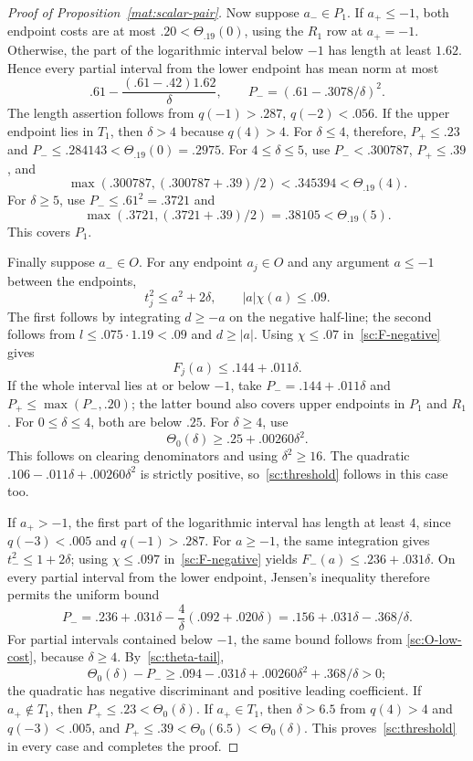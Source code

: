 \begin{proof}[Proof of Proposition~\ref{mat:scalar-pair}]
Now suppose $a_-\in P_1$.  If $a_+\le-1$, both endpoint costs are at
most $.20<\Theta_{.19}(0)$, using the $R_1$ row at $a_+=-1$.
Otherwise, the part of the logarithmic
interval below $-1$ has length at least $1.62$.  Hence every partial
interval from the lower endpoint has mean norm at most
\[
 .61-\frac{(.61-.42)1.62}{\delta},\qquad
 P_-=(.61-.3078/\delta)^2.
\]
The length assertion follows from $q(-1)>.287$, $q(-2)<.056$.
If the upper endpoint lies in $T_1$, then $\delta>4$ because $q(4)>4$.
For $\delta\le4$, therefore, $P_+\le.23$ and
$P_-\le.284143<\Theta_{.19}(0)=.2975$.
For $4\le\delta\le5$, use $P_-<.300787$, $P_+\le.39$, and
\[
 \max(.300787,(.300787+.39)/2)<.345394
 <\Theta_{.19}(4).
\]
For $\delta\ge5$, use $P_-\le.61^2=.3721$ and
\[
 \max(.3721,(.3721+.39)/2)=.38105<\Theta_{.19}(5).
\]
This covers $P_1$.

Finally suppose $a_-\in O$.  For any endpoint $a_j\in O$ and any
argument $a\le-1$ between the endpoints,
\[
 t_j^2\le a^2+2\delta,\qquad |a|\chi(a)\le .09.
\]
The first follows by integrating $d\ge-a$ on the negative half-line;
the second follows from $l\le .075\cdot1.19<.09$ and $d\ge|a|$.
Using $\chi\le.07$ in~\eqref{sc:F-negative} gives
\begin{equation}\label{sc:O-low-cost}
 F_j(a)\le .144+.011\delta.
\end{equation}
If the whole interval lies at or below $-1$, take
$P_-=.144+.011\delta$ and
$P_+\le\max(P_-,.20)$; the latter bound also covers upper endpoints
in $P_1$ and $R_1$.
For $0\le\delta\le4$, both are below $.25$.  For $\delta\ge4$, use
\begin{equation}\label{sc:theta-tail}
 \Theta_0(\delta)\ge .25+.00260\delta^2.
\end{equation}
This follows on clearing denominators and using $\delta^2\ge16$.
The quadratic $.106-.011\delta+.00260\delta^2$ is strictly positive,
so~\eqref{sc:threshold} follows in this case too.

If $a_+>-1$, the first part of the logarithmic interval has length at
least $4$, since $q(-3)<.005$ and $q(-1)>.287$.
For $a\ge-1$, the same integration gives $t_-^2\le1+2\delta$;
using $\chi\le.097$ in~\eqref{sc:F-negative} yields
$F_-(a)\le .236+.031\delta$.
On every partial interval from the lower endpoint, Jensen's inequality
therefore permits the uniform bound
\[
 P_-=.236+.031\delta-\frac{4}{\delta}(.092+.020\delta)
     =.156+.031\delta-.368/\delta.
\]
For partial intervals contained below $-1$, the same bound follows from
\eqref{sc:O-low-cost}, because $\delta\ge4$.
By~\eqref{sc:theta-tail},
\[
 \Theta_0(\delta)-P_-
 \ge .094-.031\delta+.00260\delta^2+.368/\delta>0;
\]
the quadratic has negative discriminant and positive leading coefficient.
If $a_+\notin T_1$, then $P_+\le.23<\Theta_0(\delta)$.
If $a_+\in T_1$, then $\delta>6.5$ from $q(4)>4$ and $q(-3)<.005$,
and
$P_+\le.39<\Theta_0(6.5)<\Theta_0(\delta)$.
This proves~\eqref{sc:threshold} in every case and completes the proof.
\end{proof}
